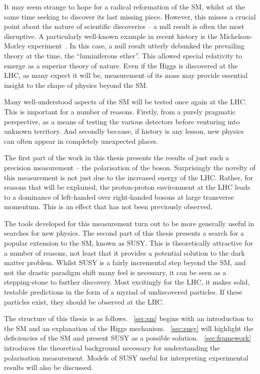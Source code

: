 It may seem strange to hope for a radical reformation of the \ac{SM}, whilst at
the same time seeking to discover its last missing piece. However, this misses a
crucial point about the nature of scientific discoveries -- a null result is
often the most disruptive. A particularly well-known example in recent history
is the Michelson-Morley experiment~\cite{michelson_morley}. In this case, a null result utterly debunked
the prevailing theory at the time, the ``luminiferous ether''. This allowed
special relativity to emerge as a superior theory of nature. Even if the Higgs
is discovered at the \ac{LHC}, as many expect it will be, measurement of its
mass may provide essential insight to the shape of physics beyond the \ac{SM}.

Many well-understood aspects of the \ac{SM} will be tested once again at the
\ac{LHC}. This is important for a number of reasons. Firstly, from a purely
pragmatic perspective, as a means of testing the various detectors before
venturing into unknown territory. And secondly because, if history is any
lesson, new physics can often appear in completely unexpected places.

The first part of the work in this thesis presents the results of just such a
precision measurement -- the polarisation of the \PW boson. Surprisingly the
novelty of this measurement is not just due to the increased energy of the
\ac{LHC}. Rather, for reasons that will be explained, the proton-proton
environment at the \ac{LHC} leads to a dominance of left-handed over
right-handed \PW bosons at large transverse momentum. This is an effect that has
not been previously observed.

The tools developed for this measurement turn out to be more generally useful in
searches for new physics. The second part of this thesis presents a search for a
popular extension to the \ac{SM}, known as \acf{SUSY}. This is theoretically
attractive for a number of reasons, not least that it provides a potential
solution to the dark matter problem. Whilst \ac{SUSY} is a fairly incremental
step beyond the \ac{SM}, and not the drastic paradigm shift many feel is
necessary, it can be seen as a stepping-stone to further discovery. Most
excitingly for the \ac{LHC}, it makes solid, testable predictions in the form of
a myriad of undiscovered particles. If these particles exist, they should be
observed at the \ac{LHC}.

The structure of this thesis is as follows. \chap~\ref{sec:sm} begins with an
introduction to the \ac{SM} and an explanation of the Higgs
mechanism. \chap~\ref{sec:susy} will highlight the deficiencies of the \ac{SM}
and present \ac{SUSY} as a possible solution. \chap~\ref{sec:framework}
introduces the theoretical background necessary for understanding the \PW
polarisation measurement. Models of \ac{SUSY} useful for interpreting
experimental results will also be discussed.

